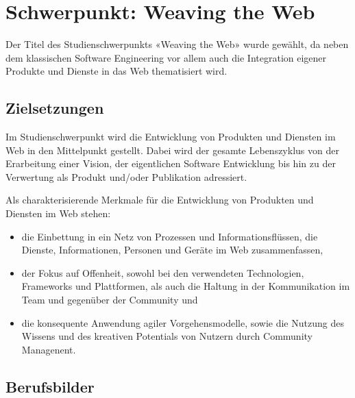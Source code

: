 \chapter{Schwerpunkt: Weaving the
Web\label{/mi-2017/modulbeschreibungen-master/schwerpunkt-weaving-the-web}}\label{schwerpunkt-weaving-the-webpathlabelmi-2017modulbeschreibungen-masterschwerpunkt-weaving-the-web}

Der Titel des Studienschwerpunkts «Weaving the Web» wurde gewählt, da
neben dem klassischen Software Engineering vor allem auch die
Integration eigener Produkte und Dienste in das Web thematisiert wird.

\section*{Zielsetzungen\label{/mi-2017/modulbeschreibungen-master/schwerpunkt-weaving-the-web}}\label{zielsetzungenpathlabelmi-2017modulbeschreibungen-masterschwerpunkt-weaving-the-web}

Im Studienschwerpunkt wird die Entwicklung von Produkten und Diensten im
Web in den Mittelpunkt gestellt. Dabei wird der gesamte Lebenszyklus von
der Erarbeitung einer Vision, der eigentlichen Software Entwicklung bis
hin zu der Verwertung als Produkt und/oder Publikation adressiert.

Als charakterisierende Merkmale für die Entwicklung von Produkten und
Diensten im Web stehen:

\begin{itemize}
\tightlist
\item
  die Einbettung in ein Netz von Prozessen und Informationsflüssen, die
  Dienste, Informationen, Personen und Geräte im Web zusammenfassen,
\item
  der Fokus auf Offenheit, sowohl bei den verwendeten Technologien,
  Frameworks und Plattformen, als auch die Haltung in der Kommunikation
  im Team und gegenüber der Community und
\item
  die konsequente Anwendung agiler Vorgehensmodelle, sowie die Nutzung
  des Wissens und des kreativen Potentials von Nutzern durch Community
  Managenent.
\end{itemize}

\section*{Berufsbilder\label{/mi-2017/modulbeschreibungen-master/schwerpunkt-weaving-the-web}}\label{berufsbilderpathlabelmi-2017modulbeschreibungen-masterschwerpunkt-weaving-the-web}

